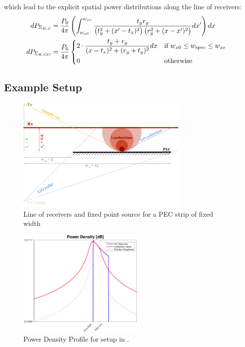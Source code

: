 \documentclass{article}
\begin{document}
which lead to the explicit spatial power distributions along the line of receivers:
\begin{align}
   dP_{\Sigma_{R, S}} &= \frac{P_0}{4 \pi} \left( \int_{w_{x0}}^{w_{xe}} \frac{t_y
      r_y}{\left( t_y^2 + (x' - t_x)^2 \right) \left( r_y^2 + (x - x')^2 \right)}
      dx' \right) dx \label{eq:powerDistributionERScattered} \\
   dP_{\Sigma_{R, GO}} &= \frac{P_0}{4 \pi}
      \begin{dcases}
         2 \cdot \frac{t_y + r_y}{(x - t_x)^2 + (r_y + t_y)^2} dx & \text{if } w_{x0} \leq
            w_{\text{spec}} \leq w_{xe} \\
         0 & \text{otherwise}
      \end{dcases} \label{eq:powerDistributionGO}
\end{align}
\newpage
\subsection{Example Setup}
\begin{figure}[h]
   \begin{center}
      \includegraphics[width=0.75\textwidth]{../figures/Setup1.pdf}
   \end{center}
   \caption{Line of receivers and fixed point source for a PEC strip of fixed
      width}\label{fig:setup1}
\end{figure}
\begin{figure}[h]
   \begin{center}
      \includegraphics[width=0.55\textwidth]{../figures/PowerDensity1.pdf}
   \end{center}
   \caption{Power Density Profile for setup in .}\label{fig:PDP1}
\end{figure}
\newpage
\end{document}
